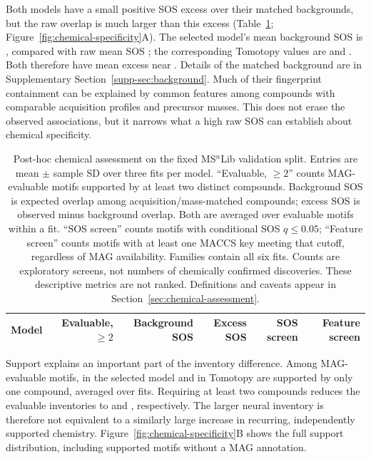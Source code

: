 \documentclass[10pt,a4paper]{article}
\begin{document}
Both models have a small positive SOS excess over their matched backgrounds,
but the raw overlap is much larger than this excess
(Table~\ref{tab:chemical-assessment}; Figure~\ref{fig:chemical-specificity}A).
The selected model's mean background SOS is \ChemSelectedBackground{},
compared with raw mean SOS \CurrentSOSMean{}; the corresponding Tomotopy
values are \ChemLDABackground{} and \ReferenceLDASOS{}.
Both therefore have mean excess near \ChemSelectedExcess{}.
Details of the matched background are in Supplementary
Section~\ref{supp-sec:background}.
Much of their fingerprint containment can be explained by common features
among compounds with comparable acquisition profiles and precursor masses.
This does not erase the observed associations, but it narrows what a high
raw SOS can establish about chemical specificity.

\begin{table}[H]
\centering\small
\caption{Post-hoc chemical assessment on the fixed MS$^{n}$Lib validation
split. Entries are mean $\pm$ sample SD over three fits per model.
``Evaluable, $\geq2$'' counts MAG-evaluable motifs supported by at least two
distinct compounds. Background SOS is expected overlap among acquisition/mass-matched compounds;
excess SOS is observed minus background overlap. Both are averaged over
evaluable motifs within a fit. ``SOS screen''
counts motifs with conditional SOS $q\leq0.05$; ``Feature screen'' counts
motifs with at least one MACCS key meeting that cutoff, regardless of MAG
availability. Families contain all six fits. Counts are exploratory screens,
not numbers of chemically confirmed discoveries. These descriptive metrics
are not ranked.
Definitions and caveats appear in Section~\ref{sec:chemical-assessment}.}
\label{tab:chemical-assessment}
\setlength{\tabcolsep}{4pt}
\begin{tabular}{@{}lrrrrr@{}}
\toprule
Model & Evaluable, $\geq2$ & Background SOS & Excess SOS & SOS screen & Feature screen \\
\midrule

\end{tabular}
\end{table}

Support explains an important part of the inventory difference. Among
MAG-evaluable motifs, \ChemSelectedSingletonEligible{} in the selected model
and \ChemLDASingletonEligible{} in Tomotopy are supported by only one
compound, averaged over fits. Requiring at least two compounds reduces the
evaluable inventories to \ChemSelectedRecurring{} and \ChemLDARecurring{},
respectively. The larger neural inventory is therefore not equivalent to
a similarly large increase in recurring, independently supported chemistry.
Figure~\ref{fig:chemical-specificity}B shows the full support distribution,
including supported motifs without a MAG annotation.
\end{document}

